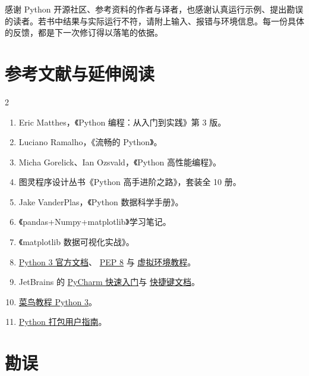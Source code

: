 \documentclass[UTF8,a4paper,oneside,openany,fontset=none,11pt]{ctexbook}
\begin{document}
感谢 Python 开源社区、参考资料的作者与译者，也感谢认真运行示例、提出勘误的读者。若书中结果与实际运行不符，请附上输入、报错与环境信息。每一份具体的反馈，都是下一次修订得以落笔的依据。

\section*{参考文献与延伸阅读}

\setlength{\columnsep}{9mm}
\setlength{\multicolsep}{3pt}
\begin{multicols}{2}
  \small
  \raggedright
  \setlength{\leftmargini}{1.9em}
  \renewcommand{\labelenumi}{\textcolor{PyBlue}{[\arabic{enumi}]}}
  \begin{enumerate}
    \setlength{\itemsep}{3pt}
    \setlength{\parsep}{0pt}
    \item Eric Matthes，《Python 编程：从入门到实践》第 3 版。
    \item Luciano Ramalho，《流畅的 Python》。
    \item Micha Gorelick、Ian Ozsvald，《Python 高性能编程》。
    \item 图灵程序设计丛书《Python 高手进阶之路》，套装全 10 册。
    \item Jake VanderPlas，《Python 数据科学手册》。
    \item 《pandas+Numpy+matplotlib》学习笔记。
    \item 《matplotlib 数据可视化实战》。
    \item \href{https://docs.python.org/zh-cn/3/}{Python 3 官方文档}、
      \href{https://peps.python.org/pep-0008/}{PEP 8} 与
      \href{https://docs.python.org/zh-cn/3/tutorial/venv.html}{虚拟环境教程}。
    \item JetBrains 的
      \href{https://www.jetbrains.com/help/pycharm/quick-start-guide.html}{PyCharm 快速入门}与
      \href{https://www.jetbrains.com/help/pycharm/mastering-keyboard-shortcuts.html}{快捷键文档}。
    \item \href{https://www.runoob.com/python3}{菜鸟教程 Python 3}。
    \item \href{https://packaging.python.org/en/latest/tutorials/packaging-projects/}{Python 打包用户指南}。
  \end{enumerate}
\end{multicols}

\section*{勘误}
\end{document}
